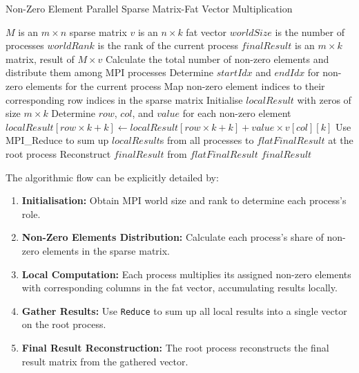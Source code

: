 \documentclass[12pt,oneside]{book} %
\begin{document}
\begin{algorithm}
    \caption{Non-Zero Element Parallel Sparse Matrix-Fat Vector Multiplication}
    \begin{algorithmic}
        \Require $M$ is an $m \times n$ sparse matrix
        \Require $v$ is an $n \times k$ fat vector
        \Require $worldSize$ is the number of processes
        \Require $worldRank$ is the rank of the current process
        \Ensure  $finalResult$ is an $m \times k$ matrix, result of $M \times v$
        \State Calculate the total number of non-zero elements and distribute them among MPI processes
        \State Determine $startIdx$ and $endIdx$ for non-zero elements for the current process
        \State Map non-zero element indices to their corresponding row indices in the sparse matrix
        \State Initialise $localResult$ with zeros of size $m \times k$
        \State Determine $row$, $col$, and $value$ for each non-zero element
        \State $localResult[row \times k + k] \gets localResult[row \times k + k] + value \times v[col][k]$
        \EndFor
        \EndFor
        \State Use MPI\_Reduce to sum up $localResult$s from all processes to $flatFinalResult$ at the root process
        \State Reconstruct $finalResult$ from $flatFinalResult$
        \State \Return $finalResult$
        \EndIf
    \end{algorithmic}
\end{algorithm}

The algorithmic flow can be explicitly detailed by:
\begin{enumerate}
    \item \textbf{Initialisation:} Obtain MPI world size and rank to determine each process's role.
    \item \textbf{Non-Zero Elements Distribution:} Calculate each process's share of non-zero elements in the sparse matrix.
    \item \textbf{Local Computation:} Each process multiplies its assigned non-zero elements with corresponding columns in the fat vector, accumulating results locally.
    \item \textbf{Gather Results:} Use \texttt{Reduce} to sum up all local results into a single vector on the root process.
    \item \textbf{Final Result Reconstruction:} The root process reconstructs the final result matrix from the gathered vector.
\end{enumerate}
\end{document}
